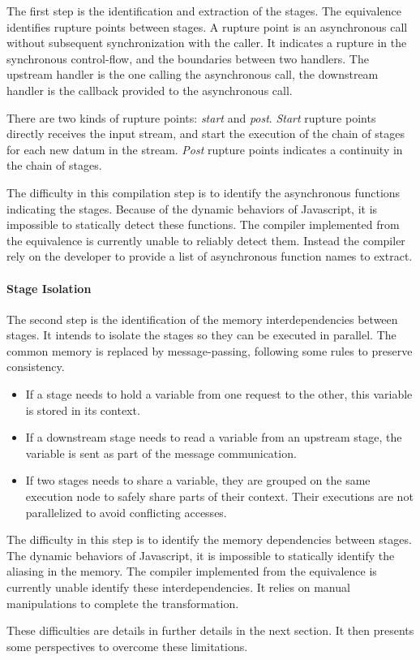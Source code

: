 The first step is the identification and extraction of the stages.
The equivalence identifies rupture points between stages.
A rupture point is an asynchronous call without subsequent synchronization with the caller.
It indicates a rupture in the synchronous control-flow, and the boundaries between two handlers.
The upstream handler is the one calling the asynchronous call, the downstream handler is the callback provided to the asynchronous call.

There are two kinds of rupture points: \textit{start} and \textit{post}.
\textit{Start} rupture points directly receives the input stream, and start the execution of the chain of stages for each new datum in the stream.
\textit{Post} rupture points indicates a continuity in the chain of stages.

The difficulty in this compilation step is to identify the asynchronous functions indicating the stages.
Because of the dynamic behaviors of Javascript, it is impossible to statically detect these functions.
The compiler implemented from the equivalence is currently unable to reliably detect them.
Instead the compiler rely on the developer to provide a list of asynchronous function names to extract.

\paragraph{Stage Isolation} \label{chapter7:summary:isolation}

The second step is the identification of the memory interdependencies between stages.
It intends to isolate the stages so they can be executed in parallel.
The common memory is replaced by message-passing, following some rules to preserve consistency.
\begin{itemize}
\item If a stage needs to hold a variable from one request to the other, this variable is stored in its context.
\item If a downstream stage needs to read a variable from an upstream stage, the variable is sent as part of the message communication.
\item If two stages needs to share a variable, they are grouped on the same execution node to safely share parts of their context.
Their executions are not parallelized to avoid conflicting accesses.
\end{itemize}

The difficulty in this step is to identify the memory dependencies between stages.
The dynamic behaviors of Javascript, it is impossible to statically identify the aliasing in the memory.
The compiler implemented from the equivalence is currently unable identify these interdependencies.
It relies on manual manipulations to complete the transformation.

\separator

These difficulties are details in further details in the next section.
It then presents some perspectives to overcome these limitations.